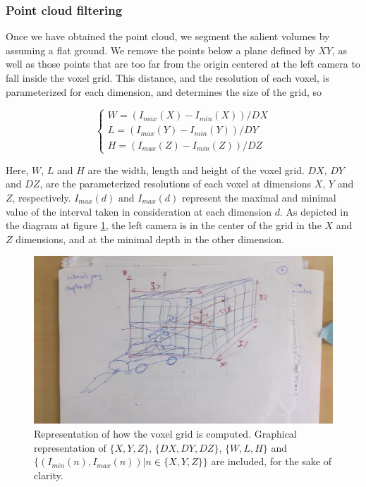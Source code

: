 \subsubsection{Point cloud filtering}\label{ch:chapter05_01_01_01}

Once we have obtained the point cloud, we segment the salient volumes by assuming a flat ground. We remove the points below a plane defined by $XY$, as well as those points that are too far from the origin centered at the left camera to fall inside the voxel grid. This distance, and the resolution of each voxel, is parameterized for each dimension, and determines the size of the grid, so

\begin{equation}\label{eq:cp05_filter_limits}
\begin{cases}
W = (I_{max}(X) - I_{min}(X)) / {DX} \\
L = (I_{max}(Y) - I_{min}(Y)) / {DY} \\
H = (I_{max}(Z) - I_{min}(Z)) / {DZ}
\end{cases}
\end{equation}

Here, $W$, $L$ and $H$ are the width, length and height of the voxel grid. $DX$, $DY$ and $DZ$, are the parameterized resolutions of each voxel at dimensions $X$, $Y$ and $Z$, respectively. $I_{max}(d)$ and $I_{max}(d)$ represent the maximal and minimal value of the interval taken in consideration at each dimension $d$. As depicted in the diagram at figure \ref{fig:cp05_intervals}, the left camera is in the center of the grid in the $X$ and $Z$ dimensions, and at the minimal depth in the other dimension.

\begin{figure}[t]
        \centering
        \includegraphics[width=\textwidth]{intervals}
        \caption{Representation of how the voxel grid is computed. Graphical representation of $\{X, Y, Z\}$, $\{DX, DY, DZ\}$, $\{W, L, H\}$ and $\{(I_{min}(n), I_{max}(n))  | n \in \{X, Y, Z\}\}$ are included, for the sake of clarity.}\label{fig:cp05_intervals}
\end{figure}

